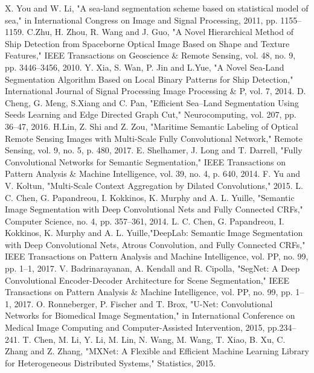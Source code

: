 \documentclass[conference]{IEEEtran}
\begin{document}
\begin{thebibliography}{00}
 X. You and W. Li, "A sea-land segmentation scheme based on statistical model of sea," in International Congress on Image and Signal Processing, 2011, pp. 1155--1159.
 C.Zhu, H. Zhou, R. Wang and J. Guo, "A Novel Hierarchical Method of Ship Detection from Spaceborne Optical Image Based on Shape and Texture Features," IEEE Transactions on Geoscience \& Remote Sensing, vol. 48, no. 9, pp. 3446--3456, 2010.
 Y. Xia, S. Wan, P. Jin and L.Yue, "A Novel Sea-Land Segmentation Algorithm Based on Local Binary Patterns for Ship Detection," International Journal of Signal Processing Image Processing \& P, vol. 7, 2014.
 D. Cheng, G. Meng, S.Xiang and C. Pan, "Efficient Sea–Land Segmentation Using Seeds Learning and Edge Directed Graph Cut," Neurocomputing, vol. 207, pp. 36--47, 2016.
 H.Lin, Z. Shi and Z. Zou, "Maritime Semantic Labeling of Optical Remote Sensing Images with Multi-Scale Fully Convolutional Network," Remote Sensing, vol. 9, no. 5, p. 480, 2017.
 E. Shelhamer, J. Long and T. Darrell, "Fully Convolutional Networks for Semantic Segmentation," IEEE Transactions on Pattern Analysis \& Machine Intelligence, vol. 39, no. 4, p. 640, 2014.
 F. Yu and V. Koltun, "Multi-Scale Context Aggregation by Dilated Convolutions," 2015.
 L. C. Chen, G. Papandreou, I. Kokkinos, K. Murphy and A. L. Yuille, "Semantic Image Segmentation with Deep Convolutional Nets and Fully Connected CRFs," Computer Science, no. 4, pp. 357--361, 2014.
 L. C. Chen, G. Papandreou, I. Kokkinos, K. Murphy and A. L. Yuille,"DeepLab: Semantic Image Segmentation with Deep Convolutional Nets, Atrous Convolution, and Fully Connected CRFs," IEEE Transactions on Pattern Analysis and Machine Intelligence, vol. PP, no. 99, pp. 1--1, 2017.
 V. Badrinarayanan, A. Kendall and R. Cipolla, "SegNet: A Deep Convolutional Encoder-Decoder Architecture for Scene Segmentation," IEEE Transactions on Pattern Analysis \& Machine Intelligence, vol. PP, no. 99, pp. 1--1, 2017.
 O. Ronneberger, P. Fischer and T. Brox, "U-Net: Convolutional Networks for Biomedical Image Segmentation," in International Conference on Medical Image Computing and Computer-Assisted Intervention, 2015, pp.234--241.
 T. Chen, M. Li, Y. Li, M. Lin, N. Wang, M. Wang, T. Xiao, B. Xu, C. Zhang and Z. Zhang, "MXNet: A Flexible and Efficient Machine Learning Library for Heterogeneous Distributed Systems," Statistics, 2015.
\end{thebibliography}
%
%
\end{document}
